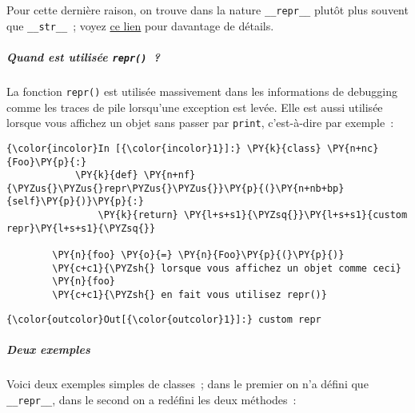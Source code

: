     Pour cette dernière raison, on trouve dans la nature
\texttt{\_\_repr\_\_} plutôt plus souvent que \texttt{\_\_str\_\_}~;
voyez
\href{https://docs.python.org/3/reference/datamodel.html\#object.__repr__}{ce
lien} pour davantage de détails.

    \hypertarget{quand-est-utilisuxe9e-repr}{%
\subparagraph{\texorpdfstring{Quand est utilisée
\texttt{repr()}~?}{Quand est utilisée repr()~?}}\label{quand-est-utilisuxe9e-repr}}

    La fonction \texttt{repr()} est utilisée massivement dans les
informations de debugging comme les traces de pile lorsqu'une exception
est levée. Elle est aussi utilisée lorsque vous affichez un objet sans
passer par \texttt{print}, c'est-à-dire par exemple~:

    \begin{Verbatim}[commandchars=\\\{\}]
{\color{incolor}In [{\color{incolor}1}]:} \PY{k}{class} \PY{n+nc}{Foo}\PY{p}{:} 
            \PY{k}{def} \PY{n+nf}{\PYZus{}\PYZus{}repr\PYZus{}\PYZus{}}\PY{p}{(}\PY{n+nb+bp}{self}\PY{p}{)}\PY{p}{:}
                \PY{k}{return} \PY{l+s+s1}{\PYZsq{}}\PY{l+s+s1}{custom repr}\PY{l+s+s1}{\PYZsq{}}
            
        \PY{n}{foo} \PY{o}{=} \PY{n}{Foo}\PY{p}{(}\PY{p}{)}
        \PY{c+c1}{\PYZsh{} lorsque vous affichez un objet comme ceci}
        \PY{n}{foo}
        \PY{c+c1}{\PYZsh{} en fait vous utilisez repr()}
\end{Verbatim}


\begin{Verbatim}[commandchars=\\\{\}]
{\color{outcolor}Out[{\color{outcolor}1}]:} custom repr
\end{Verbatim}
            
    \hypertarget{deux-exemples}{%
\subparagraph{Deux exemples}\label{deux-exemples}}

    Voici deux exemples simples de classes~; dans le premier on n'a défini
que \texttt{\_\_repr\_\_}, dans le second on a redéfini les deux
méthodes~:

